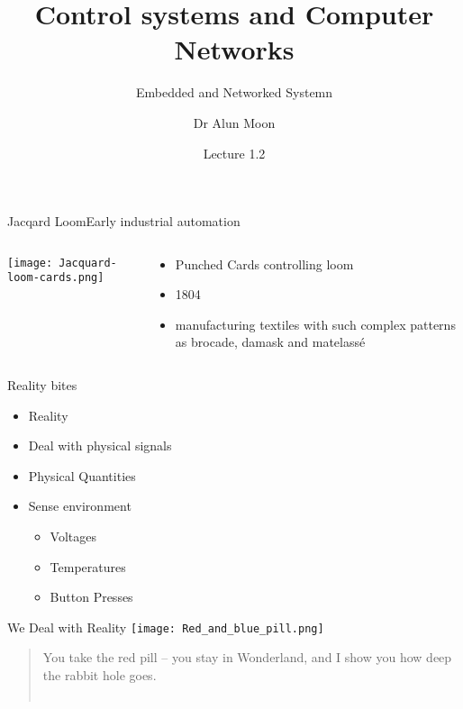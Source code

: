 \documentclass[xcolor=svgnames]{beamer}
\title{Control systems and Computer Networks}
\subtitle{Embedded and Networked Systemn}
\author{Dr Alun Moon}
\date{Lecture 1.2}
\begin{document}
\frame{\maketitle}

\begin{frame}{Jacqard Loom}{Early industrial automation}
\begin{columns}[onlytextwidth]
\begin{column}{.6\textwidth}
    \texttt{[image: Jacquard-loom-cards.png]}
\end{column}
\begin{column}{.4\textwidth}
    \begin{itemize}
        \item Punched Cards controlling loom
        \item 1804
        \item manufacturing textiles with such complex patterns as brocade, damask and matelassé
    \end{itemize}
\end{column}
\end{columns}
\end{frame}

\newcommand\redout{\bgroup\markoverwith
{\textcolor{red}{\rule[0.3ex]{2pt}{2pt}}}\ULon}
\begin{frame}{Reality bites}
    \begin{itemize}
        \item {}\only<2->{\redout{Virtual}} Reality
        \item Deal with physical signals
        \item Physical Quantities
        \item Sense environment
        \begin{itemize}
          \item Voltages
          \item Temperatures
          \item Button Presses
        \end{itemize}
    \end{itemize}
\end{frame}

\begin{frame}{We Deal with Reality}
    \texttt{[image: Red\_and\_blue\_pill.png]}\\
    \pause
    \begin{quote}
        You take the red pill -- you stay in Wonderland, and I show you how deep the rabbit hole goes.\\
        ~\hspace*{\fill}{\textit Morpheus, The Matrix}
    \end{quote}
\end{frame}
\end{document}

